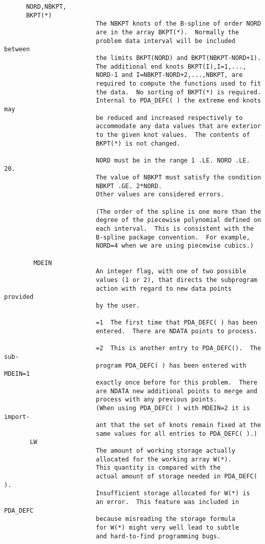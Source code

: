 \begin{verbatim}
      NORD,NBKPT,
      BKPT(*)
                         The NBKPT knots of the B-spline of order NORD
                         are in the array BKPT(*).  Normally the
                         problem data interval will be included between
                         the limits BKPT(NORD) and BKPT(NBKPT-NORD+1).
                         The additional end knots BKPT(I),I=1,...,
                         NORD-1 and I=NBKPT-NORD+2,...,NBKPT, are
                         required to compute the functions used to fit
                         the data.  No sorting of BKPT(*) is required.
                         Internal to PDA_DEFC( ) the extreme end knots may
                         be reduced and increased respectively to
                         accommodate any data values that are exterior
                         to the given knot values.  The contents of
                         BKPT(*) is not changed.

                         NORD must be in the range 1 .LE. NORD .LE. 20.
                         The value of NBKPT must satisfy the condition
                         NBKPT .GE. 2*NORD.
                         Other values are considered errors.

                         (The order of the spline is one more than the
                         degree of the piecewise polynomial defined on
                         each interval.  This is consistent with the
                         B-spline package convention.  For example,
                         NORD=4 when we are using piecewise cubics.)

        MDEIN
                         An integer flag, with one of two possible
                         values (1 or 2), that directs the subprogram
                         action with regard to new data points provided
                         by the user.

                         =1  The first time that PDA_DEFC( ) has been
                         entered.  There are NDATA points to process.

                         =2  This is another entry to PDA_DEFC().  The sub-
                         program PDA_DEFC( ) has been entered with MDEIN=1
                         exactly once before for this problem.  There
                         are NDATA new additional points to merge and
                         process with any previous points.
                         (When using PDA_DEFC( ) with MDEIN=2 it is import-
                         ant that the set of knots remain fixed at the
                         same values for all entries to PDA_DEFC( ).)
       LW
                         The amount of working storage actually
                         allocated for the working array W(*).
                         This quantity is compared with the
                         actual amount of storage needed in PDA_DEFC( ).
                         Insufficient storage allocated for W(*) is
                         an error.  This feature was included in PDA_DEFC
                         because misreading the storage formula
                         for W(*) might very well lead to subtle
                         and hard-to-find programming bugs.


\end{verbatim}
